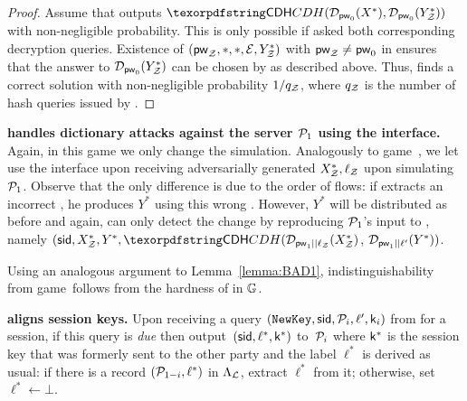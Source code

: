 \begin{games}
\begin{proof}
Assume that \Env outputs $\CDH(\Decrypt_{\firstpw}(X^*),\Decrypt_{\firstpw}(Y^*_\Env))$ with non-negligible probability. This is only possible if \Env asked  both corresponding decryption queries. Existence of $(\mathsf{pw}_\mathcal{Z},*,*,\mathcal{E},Y^*_\mathcal{Z})$ with $\mathsf{pw}_\mathcal{Z}\neq\mathsf{pw}_{0}$ in \ListIC ensures that the answer to $\mathcal{D}_{\mathsf{pw}_{0}}(Y^*_\mathcal{Z})$ can be chosen by \BCDH as described above. Thus, \BCDH finds a correct \CDH solution with non-negligible probability $1/q_\mathcal{Z}$, where $q_\mathcal{Z}$ is the number of hash queries issued by \Env.
\end{proof}
 
\textbf{\Sim handles dictionary attacks against the server $\mathcal{P}_{1}$ using the \TestPwd interface.}
Again, in this game we only change the simulation. Analogously to game~\previousgame, we let \Sim use the \TestPwd interface upon receiving adversarially generated $X^*_\mathcal{Z},\ell_\mathcal{Z}$ upon simulating $\mathcal{P}_{1}$. Observe that the only difference is due to the order of flows: if \Sim extracts an incorrect \password, he produces $Y^*$ using this wrong \password. However, $Y^*$ will be distributed as before and again, \Env can only detect the change by reproducing $\mathcal{P}_{1}$'s input to \Fro, namely $(\sid,X^*_\Env,Y^*,\CDH(\Decrypt_{\secondpw||\ell_\Env}(X^*_\Env)$, $\mathcal{D}_{\mathsf{pw}_{1}||\ell'}(Y^*))$.

Using an analogous argument to Lemma~\ref{lemma:BAD1}, indistinguishability from game~\previousgame follows from the hardness of \CDH in $\mathbb{G}$.

\textbf{\Func aligns session keys.}
Upon receiving a query $(\texttt{NewKey},\mathsf{sid},\mathcal{P}_{i},\ell',\mathsf{k}_{i})$ from \Sim for a session, if this query is \emph{due} then output~$(\mathsf{sid},\ell^*,\mathsf{k}^*)$ to~$\mathcal{P}_{i}$ where $\mathsf{k}^*$ is the session key that was formerly sent to the other party and the label $\ell^*$ is derived as usual: if there is a record $(\mathcal{P}_{1-i},\ell^*)$ in $\Lambda_{\mathcal{L}}$, extract $\ell^*$ from it; otherwise, set $\ell^*\gets\bot$. 
 

\end{games}
